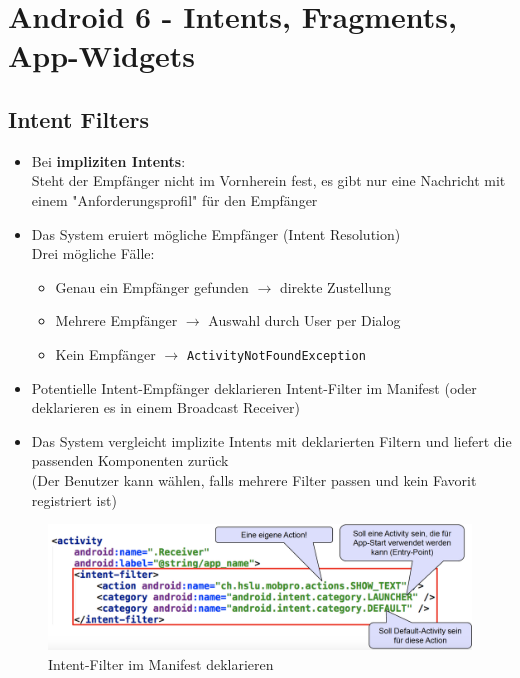 \documentclass[a4paper]{article}
\begin{document}
\newpage
\section{Android 6 - Intents, Fragments, App-Widgets}

	\subsection{Intent Filters}
	
	\begin{itemize}
		
		\item Bei \textbf{impliziten Intents}:\\
				Steht der Empfänger nicht im Vornherein fest, es gibt nur eine Nachricht mit einem "Anforderungsprofil" für den Empfänger
				
		\item Das System eruiert mögliche Empfänger (Intent Resolution)\\
				Drei mögliche Fälle:
		\begin{itemize}
			
			\item Genau ein Empfänger gefunden $\rightarrow$ direkte Zustellung
			
			\item Mehrere Empfänger $\rightarrow$ Auswahl durch User per Dialog
			
			\item Kein Empfänger $\rightarrow$ \texttt{ActivityNotFoundException}
						
		\end{itemize}
		
		\item Potentielle Intent-Empfänger deklarieren Intent-Filter im Manifest (oder deklarieren es in einem Broadcast Receiver)
		
		\item Das System vergleicht implizite Intents mit deklarierten Filtern und liefert die passenden Komponenten zurück\\
		(Der Benutzer kann wählen, falls mehrere Filter passen und kein Favorit registriert ist)
				
	\end{itemize}

	\begin{figure}[!htb]
		\centering
		\includegraphics[width=.6\textwidth]{img/android6/intentfilter_manifest.png}
		\caption{Intent-Filter im Manifest deklarieren}
		\label{fig:intentfilter_manifest}
	\end{figure}
\end{document}
